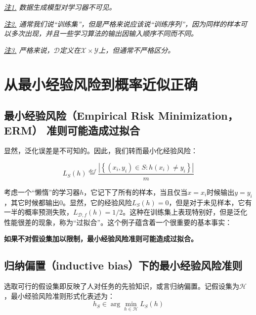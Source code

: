 \documentclass{article}
\begin{document}
	\vspace{2mm}
	\begin{scriptsize}
	\begin{spacing}{1.2}
	{\sffamily
	\noindent\textit{\underline{注1.} 数据生成模型对学习器不可见。}

    \noindent\textit{\underline{注2.} 通常我们说“训练集”，但是严格来说应该说“训练序列”，因为同样的样本可以多次出现，并且一些学习算法的输出因输入顺序不同而不同。}
    
    \noindent\textit{\underline{注3.} 严格来说，$\mathcal{D}$定义在$\mathcal{X}\times\mathcal{Y}$上，但通常不严格区分。}}
	\end{spacing}
	\end{scriptsize}
	\vspace{-2mm}
	
\section{从最小经验风险到概率近似正确}

\subsection{最小经验风险（Empirical Risk Minimization，ERM） 准则可能造成过拟合}

	显然，泛化误差是不可知的。因此，我们转而最小化经验风险：

	\begin{equation}
	L_S(h)\overset{def}{=}\frac{|\left\{(x_i,y_i)\in S:h(x_i)\neq y_i \right\}|}{m}
	\end{equation}

	考虑一个“懒惰”的学习器$h$，它记下了所有的样本，当且仅当$x=x_i$时候输出$y=y_i$，其它时候都输出0。显然，它的经验风险$L_S(h)=0$，但是对于未见样本，它有一半的概率预测失败，$L_{\mathcal{D},f}(h)=1/2$。这种在训练集上表现特别好，但是泛化性能很差的现象，称为“过拟合”。这个例子蕴含着一个很重要的基本事实：
	
	\textbf{如果不对假设集加以限制，最小经验风险准则可能造成过拟合。}

\subsection{归纳偏置（inductive bias）下的最小经验风险准则}

	选取可行的假设集即反映了人对任务的先验知识，或言归纳偏置。记假设集为$\mathcal{H}$，最小经验风险准则形式化表述为：
	\begin{equation}
	h_S\in \arg\min \limits_{h\in\mathcal{H}}L_S(h)
	\end{equation}
\end{document}
